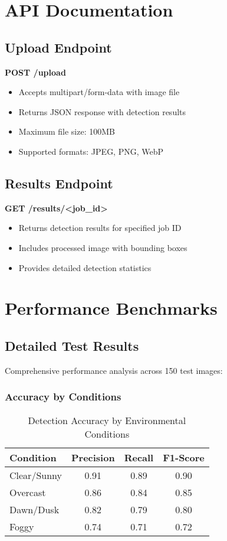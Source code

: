 \documentclass[12pt,a4paper]{report}
\begin{document}
\chapter{API Documentation}

\section{Upload Endpoint}
\textbf{POST /upload}
\begin{itemize}
    \item Accepts multipart/form-data with image file
    \item Returns JSON response with detection results
    \item Maximum file size: 100MB
    \item Supported formats: JPEG, PNG, WebP
\end{itemize}

\section{Results Endpoint}
\textbf{GET /results/<job\_id>}
\begin{itemize}
    \item Returns detection results for specified job ID
    \item Includes processed image with bounding boxes
    \item Provides detailed detection statistics
\end{itemize}

\chapter{Performance Benchmarks}

\section{Detailed Test Results}
Comprehensive performance analysis across 150 test images:

\subsection{Accuracy by Conditions}
\begin{table}[H]
\centering
\caption{Detection Accuracy by Environmental Conditions}
\begin{tabular}{@{}lccc@{}}
\toprule
Condition & Precision & Recall & F1-Score \\
\midrule
Clear/Sunny & 0.91 & 0.89 & 0.90 \\
Overcast & 0.86 & 0.84 & 0.85 \\
Dawn/Dusk & 0.82 & 0.79 & 0.80 \\
Foggy & 0.74 & 0.71 & 0.72 \\
\bottomrule
\end{tabular}
\end{table}
\end{document}
